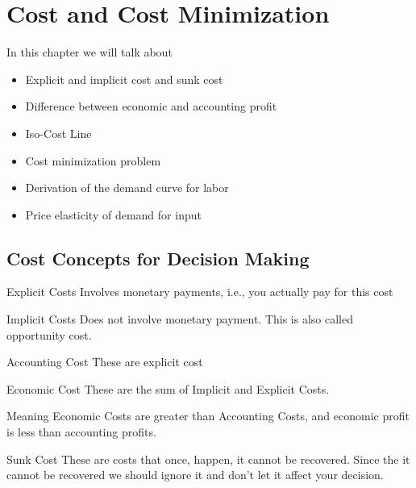 \documentclass[../ECON-281-Notes.tex]{subfiles}
\begin{document}
\chapter{Cost and Cost Minimization}
In this chapter we will talk about 
\begin{itemize}
    \item Explicit and implicit cost and sunk cost
    \item Difference between economic and accounting profit
    \item Iso-Cost Line 
    \item Cost minimization problem 
    \item Derivation of the demand curve for labor
    \item Price elasticity of demand for input 
\end{itemize}
\section{Cost Concepts for Decision Making}

\begin{Definition}
    {Explicit Costs}
    Involves monetary payments, i.e., you actually pay for this cost
\end{Definition}

\begin{Definition}
    {Implicit Costs}
    Does not involve monetary payment. This is also called opportunity cost. 
\end{Definition}

\begin{Definition}
    {Accounting Cost}
    These are explicit cost
\end{Definition}

\begin{Definition}
    {Economic Cost}
    These are the sum of Implicit and Explicit Costs.

    Meaning Economic Costs are greater than Accounting Costs, and economic profit is less than accounting profits. 
\end{Definition}

\begin{Definition}
    {Sunk Cost}
    These are costs that once, happen, it cannot be recovered. Since the it cannot be recovered we should ignore it and don't let it affect your decision.
\end{Definition}
\newpage
\end{document}
